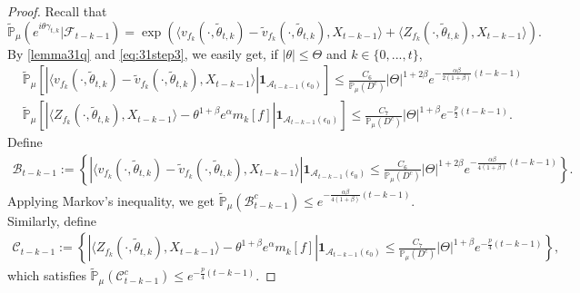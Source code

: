 \documentclass[12pt,oneside,english]{amsart}
\theoremstyle{plain}
\theoremstyle{definition}
\numberwithin{equation}{section}
\begin{document}
\begin{proof}
    Recall that
    $$\mathbb{\tilde{P}}_{\mu}\left(e^{i\theta \gamma_{t,k}}|\mathcal{F}_{t-k-1}\right)=\exp(\langle v_{f_k}(\cdot,\tilde{\theta}_{t,k})-\tilde{v}_{f_k}(\cdot, \tilde{\theta}_{t,k}),X_{t-k-1}\rangle+\langle Z_{f_k}(\cdot,\tilde{\theta}_{t,k}),X_{t-k-1}\rangle).$$
 By \eqref{lemma31q} and \eqref{eq:31step3}, we easily get, if $|\theta|\leq\Theta$ and $k\in\{0,...,t\}$,
    \begin{align*}
        &\mathbb{\tilde{P}}_{\mu}\left[\left|\langle v_{f_k}(\cdot,\tilde{\theta}_{t,k})-\tilde{v}_{f_k}(\cdot,\tilde{\theta}_{t,k}), X_{t-k-1}\rangle\right|\mathbf{1}_{\mathcal{A}_{t-k-1}(\epsilon_0)}\right]\leq \frac{C_{6}}{\mathbb{P}_{\mu}(D^c)}|\Theta|^{1+2\beta} e^{-\frac{\alpha\beta}{2(1+\beta)}(t-k-1)}\\
        &\mathbb{\tilde{P}}_{\mu}\left[\left|\langle Z_{f_k}(\cdot,\tilde{\theta}_{t,k}),X_{t-k-1}\rangle-\theta^{1+\beta}e^{\alpha}m_k[f]\right|\mathbf{1}_{\mathcal{A}_{t-k-1}(\epsilon_0)}\right]\leq \frac{C_{7}}{\mathbb{P}_{\mu}(D^c)}|\Theta|^{1+\beta} e^{-\frac{p}{2}(t-k-1)}.
    \end{align*}
 Define
\begin{align*}
    \mathcal{B}_{t-k-1}:=\left\{\left|\langle v_{f_k}(\cdot,\tilde{\theta}_{t,k})-\tilde{v}_{f_k}(\cdot,\tilde{\theta}_{t,k}), X_{t-k-1}\rangle\right|\mathbf{1}_{\mathcal{A}_{t-k-1}(\epsilon_0)}\leq\frac{C_{6}}{\mathbb{P}_{\mu}(D^c)}|\Theta|^{1+2\beta} e^{-\frac{\alpha\beta}{4(1+\beta)}(t-k-1)}\right\}.
\end{align*}
Applying Markov's inequality, we get $\mathbb{\tilde{P}}_{\mu}(\mathcal{B}^c_{t-k-1})\leq e^{-\frac{\alpha\beta}{4(1+\beta)}(t-k-1)}$. Similarly, define
\begin{align*}
    \mathcal{C}_{t-k-1}:=\left\{\left|\langle Z_{f_k}(\cdot,\tilde{\theta}_{t,k}),X_{t-k-1}\rangle-\theta^{1+\beta}e^{\alpha}m_k[f]\right|\mathbf{1}_{\mathcal{A}_{t-k-1}(\epsilon_0)}\leq \frac{C_{7}}{\mathbb{P}_{\mu}(D^c)}|\Theta|^{1+\beta} e^{-\frac{p}{4}(t-k-1)}\right\},
\end{align*}
 which satisfies  $\mathbb{\tilde{P}}_{\mu}(\mathcal{C}^c_{t-k-1})\leq e^{-\frac{p}{4}(t-k-1)}$.


\end{proof}
\end{document}
